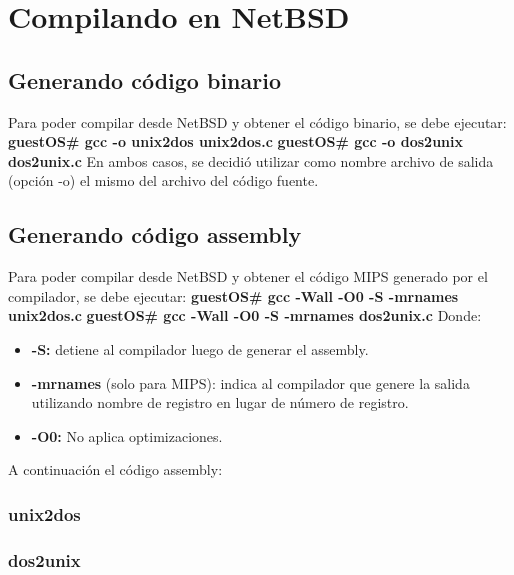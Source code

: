\documentclass[a4paper,10pt]{article}
\begin{document}
\section{Compilando en NetBSD}
  \subsection{Generando c\'odigo binario}
    Para poder compilar desde NetBSD y obtener el c\'odigo binario, se debe ejecutar:
    \newline
    {\bf guestOS\# gcc -o unix2dos unix2dos.c} \newline
    {\bf guestOS\# gcc -o dos2unix dos2unix.c}
    \newline
    En ambos casos, se decidi\'o utilizar como nombre archivo de salida (opci\'on -o) el mismo del archivo 
    del c\'odigo fuente.
    
  \subsection{Generando c\'odigo assembly}
    Para poder compilar desde NetBSD y obtener el c\'odigo MIPS generado por el compilador, se debe ejecutar:
    \newline
    {\bf guestOS\# gcc -Wall -O0 -S -mrnames unix2dos.c} 
    \newline
    {\bf guestOS\# gcc -Wall -O0 -S -mrnames dos2unix.c}
    \newline
    Donde:
    \begin{itemize}
      \item {\bf-S:} detiene al compilador luego de generar el assembly.
      \item {\bf-mrnames} (solo para MIPS): indica al compilador que genere la salida utilizando nombre de 
	registro en lugar de n\'umero de registro.
      \item {\bf-O0:} No aplica optimizaciones.
    \end{itemize}
    A continuaci\'on el c\'odigo assembly:
    \subsubsection{unix2dos}
      \lstset{numbers=left, frame=single, breaklines=true}
      
    \subsubsection{dos2unix}
      \lstset{numbers=left, frame=single, breaklines=true}
      
\end{document}
